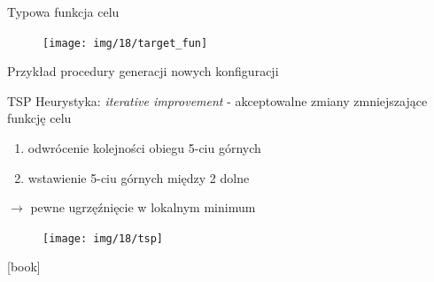 
	\begin{frame}{Typowa funkcja celu}
		\begin{figure}
			\texttt{[image: img/18/target\_fun]}
		\end{figure}
	\end{frame}


	


	\begin{frame}{Przykład procedury generacji nowych konfiguracji}
		\begin{exampleblock}{TSP \cite{lin}}
			Heurystyka: \textit{iterative improvement} - akceptowalne zmiany zmniejszające funkcję celu
			\begin{enumerate}
				\item odwrócenie kolejności obiegu 5-ciu górnych
				\item wstawienie 5-ciu górnych między 2 dolne
			\end{enumerate}
			$\rightarrow$ pewne ugrzęźnięcie w lokalnym minimum
			\begin{figure}
				\texttt{[image: img/18/tsp]}
			\end{figure}
		\end{exampleblock}
		\begin{thebibliography}{9}
			[book]
		\end{thebibliography}
	\end{frame}
